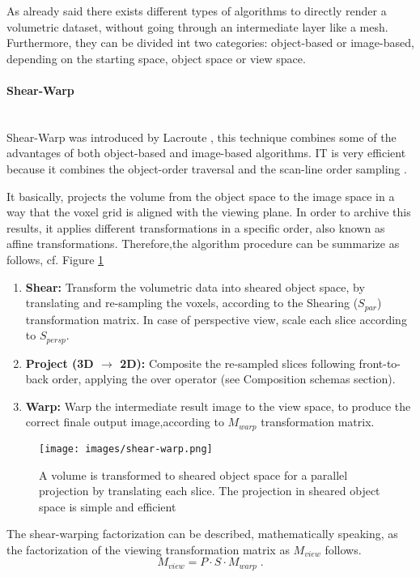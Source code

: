 \documentclass[12pt,a4paper]{extarticle}
\newcommand{\myparagraph}[1]{\paragraph{#1}\mbox{}\\}
\begin{document}
As already said there exists different types of algorithms to directly render a volumetric dataset, without going through an intermediate layer like a mesh.
Furthermore, they can be divided int two categories: object-based or image-based, depending on the starting space, object space or view space.

\myparagraph{Shear-Warp} Shear-Warp was introduced by Lacroute \cite{Lacroute:1994:FVR:192161.192283}, this technique combines some of the advantages of both object-based and image-based algorithms. IT is very efficient because it combines the object-order traversal and the scan-line order sampling \cite{PFISTER2005229}.


It basically, projects the volume from the object space to the image space in a way that the voxel grid is aligned with the viewing plane.
In order to archive this results, it applies different transformations in a specific order, also known as affine transformations.
Therefore,the algorithm procedure can be summarize as follows, cf. Figure \ref{fig:shearwparring}
\begin{enumerate}
\item \textbf{Shear:} Transform the volumetric data into sheared object space, by translating and re-sampling the voxels, according to the Shearing ($S_{par}$) transformation matrix. In case of perspective view, scale each slice according to $S_{persp}$.
\item \textbf{Project (3D $\rightarrow$ 2D):} Composite the re-sampled slices following front-to-back order, applying the over operator (see Composition schemas section).
\item \textbf{Warp:} Warp the intermediate result image to the view space, to produce the correct finale output image,according to $M_{warp}$ transformation matrix.
\end{enumerate} %

\begin{figure}[hbtp]
\centering
\texttt{[image: images/shear-warp.png]}
\caption{ A volume is transformed to sheared object space for
a parallel projection by translating each slice. The projection in
sheared object space is simple and efficient}
\label{fig:shearwparring}
\end{figure}

The shear-warping factorization can be described, mathematically speaking, as the factorization of the viewing transformation matrix as $M_{view}$ follows.
\[
M_{view} = P \cdot S \cdot M_{warp} \;.
\]
\end{document}

